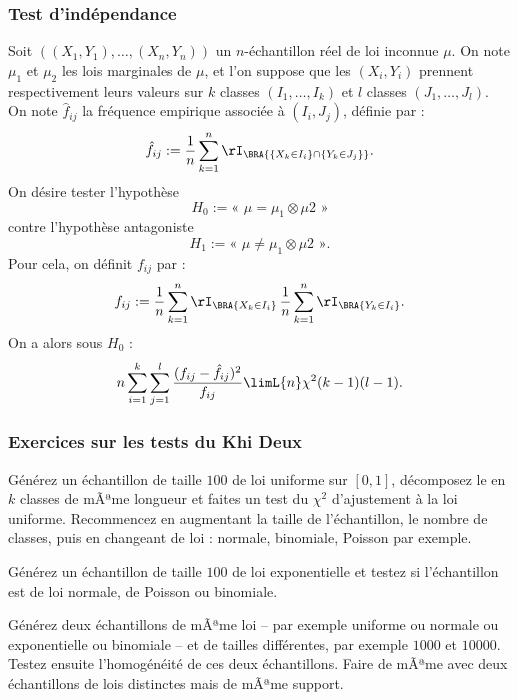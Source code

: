 \subsubsection{Test d'indépendance}

Soit $((X_1,Y_1),\ldots,(X_n,Y_n))$ un $n$-échantillon réel de loi inconnue
$\mu$. On note $\mu_1$ et $\mu_2$ les lois marginales de $\mu$, et l'on
suppose que les $(X_i,Y_i)$ prennent respectivement leurs valeurs sur $k$
classes $(I_1,\ldots,I_k)$ et $l$ classes $(J_1,\ldots,J_l)$. On note $\hat
f_{ij}$ la fréquence empirique associée à $(I_i,J_j)$, définie par :
\begin{equation*}
  \hat f_{ij}
  :=\frac{1}{n}\sum_{k=1}^n \rI_\BRA{\{X_k \in I_i\}\cap\{Y_k \in J_j\}}.
\end{equation*}
On désire tester l'hypothèse
$$
H_0 := \text{« } \mu=\mu_1\otimes\mu2 \text{ »}
$$
contre l'hypothèse antagoniste
$$
H_1 := \text{« } \mu \neq \mu_1\otimes\mu2 \text{ »}.
$$
Pour cela, on définit $f_{ij}$ par :
\begin{equation*}
  f_{ij}:=
  \frac{1}{n}\sum_{k=1}^n\rI_\BRA{X_k \in I_i}
  \,
  \frac{1}{n}\sum_{k=1}^n\rI_\BRA{Y_k \in I_i}.
\end{equation*}
On a alors sous $H_0$ :
\begin{equation*}
  n\sum_{i=1}^k 
  \sum _{j=1}^l \frac{(f_{ij}-\hat f_{ij})^2}{f_{ij}} 
  \limL{n} \chi^2(k-1)(l-1).
\end{equation*}

\subsubsection{Exercices sur les tests du Khi Deux}

\begin{exo}
  Générez un échantillon de taille $100$ de loi uniforme sur $[0,1]$,
  décomposez le en $k$ classes de mÃªme longueur et faites un test du $\chi^2$
  d'ajustement à la loi uniforme. Recommencez en augmentant la taille de
  l'échantillon, le nombre de classes, puis en changeant de loi : normale,
  binomiale, Poisson par exemple.
\end{exo}

\begin{exo}
  Générez un échantillon de taille $100$ de loi exponentielle et testez si
  l'échantillon est de loi normale, de Poisson ou binomiale.
\end{exo}

\begin{exo}
  Générez deux échantillons de mÃªme loi -- par exemple uniforme ou normale ou
  exponentielle ou binomiale -- et de tailles différentes, par exemple $1000$ et
  $10000$. Testez ensuite l'homogénéité de ces deux échantillons. Faire de
  mÃªme avec deux échantillons de lois distinctes mais de mÃªme support.
\end{exo}

